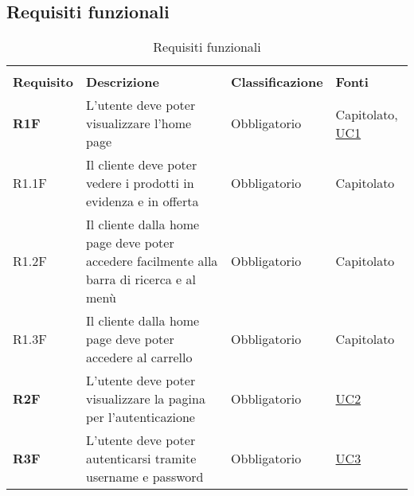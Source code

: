 \subsection{Requisiti funzionali}
\begin{center}
    \centering
    \renewcommand{\arraystretch}{1.8}
    \label{tab:RequisitiFunzionali}
    \begin{longtable}[!h]{p{50px} p{245px} p{75px} p{50px}}
        \rowcolor{white}\caption{Requisiti funzionali}                                                                                                                                                                               \\
        \rowcolor{logo!70} \textbf{Requisito} & \textbf{Descrizione}                                                                                       & \textbf{Classificazione} & \textbf{Fonti}                               \\
        \textbf{R1F}                          & L'utente deve poter visualizzare l'home page                                                               & Obbligatorio             & Capitolato, \newline \hyperref[sec:UC1]{UC1} \\
        R1.1F                                 & Il cliente deve poter vedere i prodotti in evidenza e in offerta                                           & Obbligatorio             & Capitolato                                   \\
        R1.2F                                 & Il cliente dalla home page deve poter accedere facilmente alla barra di ricerca e al menù                  & Obbligatorio             & Capitolato                                   \\
        R1.3F                                 & Il cliente dalla home page deve poter accedere al carrello                                                 & Obbligatorio             & Capitolato                                   \\
        \textbf{R2F}                          & L'utente deve poter visualizzare la pagina per l'autenticazione                                            & Obbligatorio             & \hyperref[sec:UC2]{UC2}                      \\
        \textbf{R3F}                          & L'utente deve poter autenticarsi tramite username e password                                               & Obbligatorio             & \hyperref[sec:UC3]{UC3}                      \\

\end{longtable}
\end{center}
